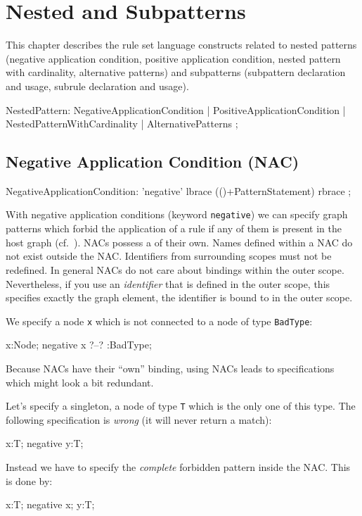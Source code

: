 \chapter{Nested and Subpatterns}
\label{cha:nestedsub}

This chapter describes the rule set language constructs related to nested patterns (negative application condition, positive application condition, nested pattern with cardinality, alternative patterns) and subpatterns (subpattern declaration and usage, subrule declaration and usage).

\begin{rail}  
  NestedPattern: 
    NegativeApplicationCondition |
    PositiveApplicationCondition |
    NestedPatternWithCardinality |
    AlternativePatterns 
    ;
\end{rail}

\section{Negative Application Condition (NAC)}
\label{nac}

\begin{rail}  
  NegativeApplicationCondition: 
    'negative' lbrace (()+PatternStatement) rbrace
    ;
\end{rail}

  With negative application conditions (keyword \texttt{negative}) we can specify graph patterns which forbid the application of a rule if any of them is present in the host graph (cf.~\cite{adam}). 
  NACs possess a  of their own. 
  Names defined within a NAC do not exist outside the NAC. 
  Identifiers from surrounding scopes must not be redefined.
  In general NACs do not care about bindings within the outer scope. 
   Nevertheless, if you use an \emph{identifier} that is defined in the outer scope, this specifies exactly the graph element, the identifier is bound to in the outer scope.
  \begin{example}
    We specify a node \texttt{x} which is not connected to a node of type \texttt{BadType}:
    \begin{grgen}
  x:Node;
  negative {
    x ?--? :BadType;
  }
    \end{grgen}
  \end{example}
   Because NACs have their ``own'' binding, using NACs leads to specifications which might look a bit redundant.
  \begin{example}
    Let's specify a singleton, a node of type \texttt{T} which is the only one of this type.
    The following specification is \emph{wrong} (it will never return a match):
    \begin{grgen}
  x:T;
  negative {
    y:T;
  }
    \end{grgen}
    Instead we have to specify the \emph{complete} forbidden pattern inside the NAC. This is done by:
     \begin{grgen}
  x:T;
  negative {
    x;
    y:T;
  }
    \end{grgen}
  \end{example} 

